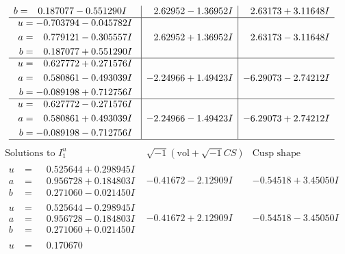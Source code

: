 \documentclass[1p]{elsarticle_modified}
\theoremstyle{definition}
\newcommand{\I}{\sqrt{-1}}
\begin{document}
$$\begin{array}{c|c|c}
\begin{aligned}
b &= \phantom{-}0.187077 - 0.551290 I\end{aligned}
 & \phantom{-}2.62952 - 1.36952 I & \phantom{-}2.63173 + 3.11648 I \\ \hline\begin{aligned}
u &= -0.703794 - 0.045782 I \\
a &= \phantom{-}0.779121 - 0.305557 I \\
b &= \phantom{-}0.187077 + 0.551290 I\end{aligned}
 & \phantom{-}2.62952 + 1.36952 I & \phantom{-}2.63173 - 3.11648 I \\ \hline\begin{aligned}
u &= \phantom{-}0.627772 + 0.271576 I \\
a &= \phantom{-}0.580861 - 0.493039 I \\
b &= -0.089198 + 0.712756 I\end{aligned}
 & -2.24966 + 1.49423 I & -6.29073 - 2.74212 I \\ \hline\begin{aligned}
u &= \phantom{-}0.627772 - 0.271576 I \\
a &= \phantom{-}0.580861 + 0.493039 I \\
b &= -0.089198 - 0.712756 I\end{aligned}
 & -2.24966 - 1.49423 I & -6.29073 + 2.74212 I\\
 \hline 
 \end{array}$$\newpage$$\begin{array}{c|c|c}  
\text{Solutions to }I^u_{1}& \I (\text{vol} + \sqrt{-1}CS) & \text{Cusp shape}\\
 \hline 
\begin{aligned}
u &= \phantom{-}0.525644 + 0.298945 I \\
a &= \phantom{-}0.956728 + 0.184803 I \\
b &= \phantom{-}0.271060 - 0.021450 I\end{aligned}
 & -0.41672 - 2.12909 I & -0.54518 + 3.45050 I \\ \hline\begin{aligned}
u &= \phantom{-}0.525644 - 0.298945 I \\
a &= \phantom{-}0.956728 - 0.184803 I \\
b &= \phantom{-}0.271060 + 0.021450 I\end{aligned}
 & -0.41672 + 2.12909 I & -0.54518 - 3.45050 I \\ \hline\begin{aligned}
u &= \phantom{-}0.170670\phantom{ +0.000000I} \\

\end{aligned}
\end{array}$$
\end{document}
